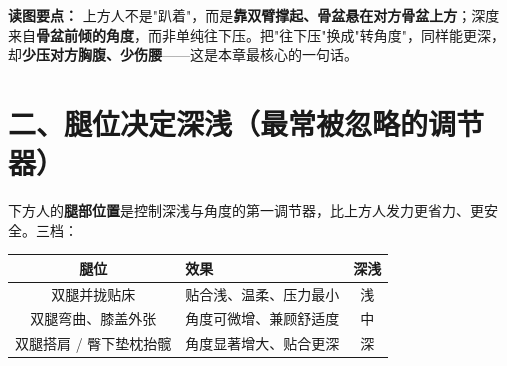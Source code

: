 \documentclass[12pt,UTF8,openany]{ctexbook}
\begin{document}
\noindent\textbf{读图要点：} 上方人不是"趴着"，而是\textbf{靠双臂撑起、骨盆悬在对方骨盆上方}；深度来自\textbf{骨盆前倾的角度}，而非单纯往下压。把"往下压"换成"转角度"，同样能更深，却\textbf{少压对方胸腹、少伤腰}——这是本章最核心的一句话。

\section{二、腿位决定深浅（最常被忽略的调节器）}

下方人的\textbf{腿部位置}是控制深浅与角度的第一调节器，比上方人发力更省力、更安全。三档：

\begin{tabularx}{\textwidth}{C X C}
\toprule
腿位 & 效果 & 深浅 \\
\midrule
双腿并拢贴床 & 贴合浅、温柔、压力最小 & 浅 \\
双腿弯曲、膝盖外张 & 角度可微增、兼顾舒适度 & 中 \\
双腿搭肩 / 臀下垫枕抬髋 & 角度显著增大、贴合更深 & 深 \\
\bottomrule
\end{tabularx}
\end{document}
